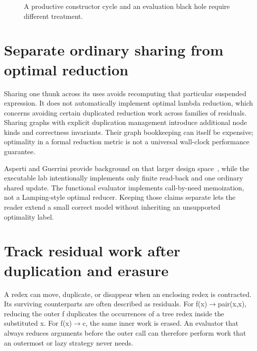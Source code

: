 \begin{figure}[htbp]
\centering
{}
\caption{A productive constructor cycle and an evaluation black hole require different treatment.}
\label{fig:ch86-cycle}
\end{figure}

\section{Separate ordinary sharing from optimal reduction}
\label{sec:ch86-optimal}
Sharing one thunk across its uses avoids recomputing that particular suspended expression.
It does not automatically implement optimal lambda reduction, which concerns avoiding certain duplicated reduction work across families of residuals.
Sharing graphs with explicit duplication management introduce additional node kinds and correctness invariants.
Their graph bookkeeping can itself be expensive; optimality in a formal reduction metric is not a universal wall-clock performance guarantee.

Asperti and Guerrini provide background on that larger design space~\cite{asperti-1998-optimal}, while the executable lab intentionally implements only finite read-back and one ordinary shared update.
The functional evaluator implements call-by-need memoization, not a Lamping-style optimal reducer.
Keeping those claims separate lets the reader extend a small correct model without inheriting an unsupported optimality label.

\section{Track residual work after duplication and erasure}
\label{sec:ch86-residuals}
A redex can move, duplicate, or disappear when an enclosing redex is contracted.
Its surviving counterparts are often described as residuals.
For f(x)$\to$pair(x,x), reducing the outer f duplicates the occurrences of a tree redex inside the substituted x.
For f(x)$\to$c, the same inner work is erased.
An evaluator that always reduces arguments before the outer call can therefore perform work that an outermost or lazy strategy never needs.

